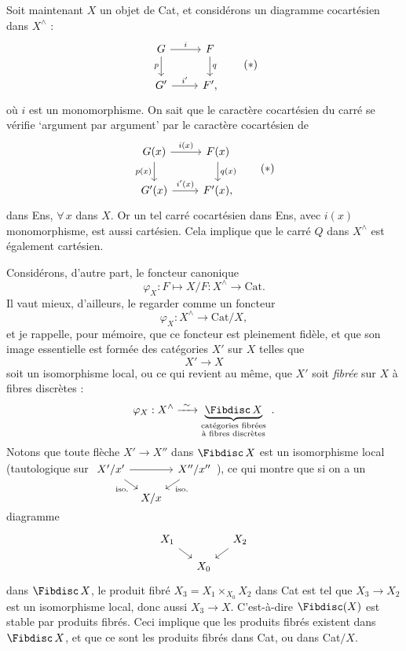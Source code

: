 Soit maintenant $X$ un objet de Cat, et considérons un diagramme cocartésien dans $X^{\wedge}$ :
\[
\begin{tikzcd}
G \ar[r, "i"] \ar[d, "p"'] & F \ar[d, "q"] \\
G' \ar[r, "i'"] & F',
\end{tikzcd}
\tag*{$(*)$}
\]
où $i$ est un monomorphisme. On sait que le caractère cocartésien du carré se vérifie `argument par argument' par le caractère cocartésien de
\[
\begin{tikzcd}
G(x) \ar[r, "i(x)"] \ar[d, "p(x)"'] & F(x) \ar[d, "q(x)"] \\
G'(x) \ar[r, "i'(x)"] & F'(x),
\end{tikzcd}
\tag*{$(*)$}
\]
dans Ens, $\forall\, x$ dans $X$. Or un tel carré cocartésien dans Ens, avec $i(x)$ monomorphisme, est aussi cartésien. Cela implique que le carré $Q$ dans $X^{\wedge}$ est également cartésien.

Considérons, d'autre part, le foncteur canonique
\[
\varphi_X : F \longmapsto X/F : X^{\wedge} \longrightarrow \mathrm{Cat}.
\]
Il vaut mieux, d'ailleurs, le regarder comme un foncteur
\[
\varphi_X : X^{\wedge} \longrightarrow \mathrm{Cat}/X,
\]
et je rappelle, pour mémoire, que ce foncteur est pleinement fidèle, et que son image essentielle est formée des catégories $X'$ sur $X$ telles que
\[
X' \longrightarrow X
\]
soit un isomorphisme local, ou ce qui revient au même, que $X'$ soit \textit{fibrée} sur $X$ à fibres discrètes :
\[
\varphi_X : X^{\wedge} \xrightarrow{\ \sim\ } \underbrace{\Fibdisc\, X}_{\substack{\text{catégories fibrées}\\ \text{à fibres discrètes}}} \ .
\]
Notons que toute flèche $X' \longrightarrow X''$ dans $\Fibdisc\, X$ est un isomorphisme local (tautologique sur $\begin{tikzcd}[ampersand replacement=\&, row sep=small, column sep=tiny, baseline=(\tikzcdmatrixname-1-1.base)] X'/x' \ar[rr] \ar[dr, "\text{iso.}"'] \& \& X''/x'' \ar[dl, "\text{iso.}"] \\ \& X/x \& \end{tikzcd}$), ce qui montre que si on a un diagramme
\[
\begin{tikzcd}[row sep=small, column sep=small]
X_1 \ar[dr] & & X_2 \ar[dl] \\
& X_0 &
\end{tikzcd}
\]
dans $\Fibdisc\, X$, le produit fibré $X_3 = X_1 \times_{X_0} X_2$ dans Cat est tel que $X_3 \longrightarrow X_2$ est un isomorphisme local, donc aussi $X_3 \longrightarrow X$. C'est-à-dire $\Fibdisc(X)$ est stable par produits fibrés. Ceci implique que les produits fibrés existent dans $\Fibdisc\, X$, et que ce sont les produits fibrés dans Cat, ou dans Cat$/X$.

